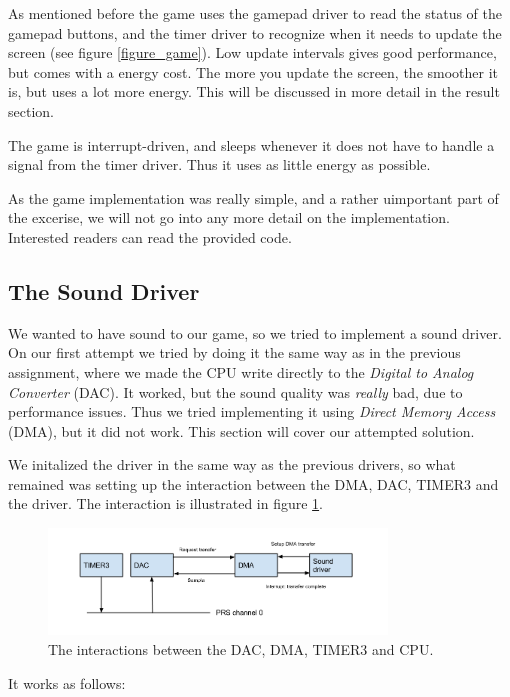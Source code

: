 As mentioned before the game uses the gamepad driver to read the status of the gamepad buttons, and the timer driver to recognize when it needs to update the screen (see figure \ref{figure_game}). Low update intervals gives good performance, but comes with a energy cost. The more you update the screen, the smoother it is, but uses a lot more energy. This will be discussed in more detail in the result section. 

The game is interrupt-driven, and sleeps whenever it does not have to handle a signal from the timer driver. Thus it uses as little energy as possible.

As the game implementation was really simple, and a rather uimportant part of the excerise, we will not go into any more detail on the implementation. Interested readers can read the provided code. 

\subsection{The Sound Driver}

We wanted to have sound to our game, so we tried to implement a sound driver. On our first attempt we tried by doing it the same way as in the previous assignment, where we made the CPU write directly to the \textit{Digital to Analog Converter} (DAC). It worked, but the sound quality was \emph{really} bad, due to performance issues. Thus we tried implementing it using \textit{Direct Memory Access} (DMA), but it did not work. This section will cover our attempted solution.  

We initalized the driver in the same way as the previous drivers, so what remained was setting up the interaction between the DMA, DAC, TIMER3 and the driver. The interaction is illustrated in figure \ref{figure_dma}.

\begin{figure}[ht]
    \centering
      \includegraphics[width=9cm]{figures/DMA}
    \caption{The interactions between the DAC, DMA, TIMER3 and CPU.}
    \label{figure_dma}
\end{figure}

It works as follows:

